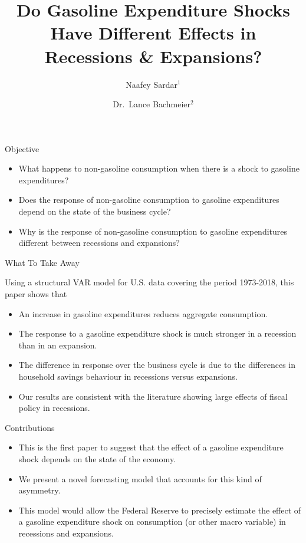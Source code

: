 \documentclass[
  10pt,
  ignorenonframetext,
]{beamer}
\title{Do Gasoline Expenditure Shocks Have Different Effects in Recessions \&
Expansions?}
\author{Naafey Sardar\(^1\) \and Dr.~Lance Bachmeier\(^2\)}
\date{}
\institute{\(^1\)Ph.D.~Candidate, Department of Economics, Kansas State University \and \(^2\)Associate Professor, Department of Economics, Kansas State
University}
\begin{document}
\frame{\titlepage}

\begin{frame}{Objective}
\protect\hypertarget{objective}{}

\begin{itemize}
\item
  What happens to non-gasoline consumption when there is a shock to
  gasoline expenditures?
\item
  Does the response of non-gasoline consumption to gasoline expenditures
  depend on the state of the business cycle?
\item
  Why is the response of non-gasoline consumption to gasoline
  expenditures different between recessions and expansions?
\end{itemize}

\end{frame}

\begin{frame}{What To Take Away}
\protect\hypertarget{what-to-take-away}{}

Using a structural VAR model for U.S. data covering the period
1973-2018, this paper shows that

\begin{itemize}
\item
  An increase in gasoline expenditures reduces aggregate consumption.
\item
  The response to a gasoline expenditure shock is much stronger in a
  recession than in an expansion.
\item
  The difference in response over the business cycle is due to the
  differences in household savings behaviour in recessions versus
  expansions.
\item
  Our results are consistent with the literature showing large effects
  of fiscal policy in recessions.
\end{itemize}

\end{frame}

\begin{frame}{Contributions}
\protect\hypertarget{contributions}{}

\begin{itemize}
\item
  This is the first paper to suggest that the effect of a gasoline
  expenditure shock depends on the state of the economy.
\item
  We present a novel forecasting model that accounts for this kind of
  asymmetry.
\item
  This model would allow the Federal Reserve to precisely estimate the
  effect of a gasoline expenditure shock on consumption (or other macro
  variable) in recessions and expansions.
\end{itemize}

\end{frame}
\end{document}

